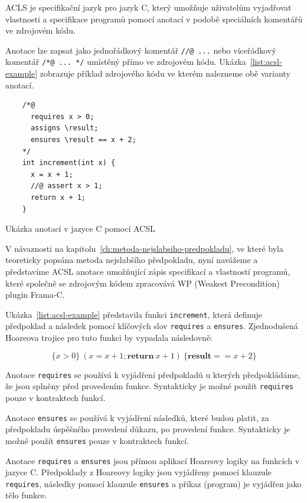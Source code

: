 ACLS je specifikační jazyk pro jazyk C, který umožňuje uživatelům
vyjadřovat vlastnosti a specifikace programů pomocí anotací v podobě speciálních komentářů ve zdrojovém kódu.

Anotace lze zapsat jako jednořádkový komentář \texttt{//@ ...} nebo víceřádkový komentář \texttt{/*@ ... */} umístěný přímo ve zdrojovém kódu.
Ukázka~\ref{list:acsl-example} zobrazuje příklad zdrojového kódu ve kterém nalezneme obě varianty anotací.

\begin{listing}[H]
    \begin{verbatim}
    /*@
      requires x > 0;
      assigns \result;
      ensures \result == x + 2;
    */
    int increment(int x) {
      x = x + 1;
      //@ assert x > 1;
      return x + 1;
    }
    \end{verbatim}
    \caption{Ukázka anotací v jazyce C pomocí ACSL}
    \label{list:acsl-example}
\end{listing}

V návaznosti na kapitolu~\ref{ch:metoda-nejslabsiho-predpokladu},
ve které byla teoreticky popsána metoda nejslabšího předpokladu,
nyní navážeme a představíme ACSL anotace umožňující zápis specifikací a vlastností programů,
které společně se zdrojovým kódem zpracovává WP (Weakest Precondition) plugin Frama\mbox{-}C\@.

Ukázka~\ref{list:acsl-example} představila funkci \texttt{increment},
která definuje předpoklad a následek pomocí klíčových slov \texttt{requires} a \texttt{ensures}.
Zjednodušená Hoareova trojice pro tuto funkci by vypadala následovně:

\begin{equation*}
    \{ x > 0 \} \ (x = x + 1; \textbf{return} \  x + 1) \ \{ \textbf{result} == x + 2 \}
\end{equation*}

Anotace \texttt{requires} se používá k vyjádření předpokladů
u kterých předpokládáme, že jsou splněny před provedením funkce.
Syntakticky je možné použít \texttt{requires} pouze v kontraktech funkcí.

Anotace \texttt{ensures} se používá k vyjádření následků,
které budou platit, za předpokladu úspěšného provedení důkazu, po provedení funkce.
Syntakticky je možné použít \texttt{ensures} pouze v kontraktech funkcí.

Anotace \texttt{requires} a \texttt{ensures}
jsou přímou aplikací Hoareovy logiky na funkcích v jazyce C\@.
Předpoklady z Hoareovy logiky jsou vyjádřeny pomocí klauzule \texttt{requires},
následky pomocí klauzule \texttt{ensures} a příkaz (program) je vyjádřen jako tělo funkce.

